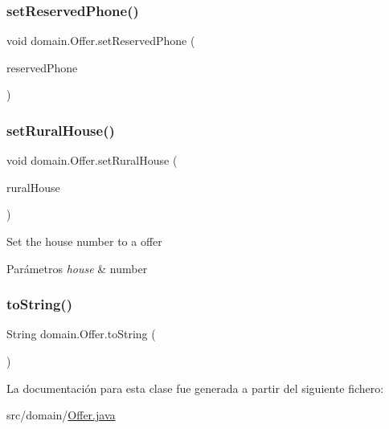 \subsubsection{\texorpdfstring{setReservedPhone()}{setReservedPhone()}}
{\footnotesize\ttfamily void domain.\+Offer.\+set\+Reserved\+Phone (\begin{DoxyParamCaption}\item[{String}]{reserved\+Phone }\end{DoxyParamCaption})}

\mbox{\label{classdomain_1_1_offer_a2050ed4cf76a2a2863d08e89bdf4a7df}} 
\subsubsection{\texorpdfstring{setRuralHouse()}{setRuralHouse()}}
{\footnotesize\ttfamily void domain.\+Offer.\+set\+Rural\+House (\begin{DoxyParamCaption}\item[{\mbox{\hyperlink{classdomain_1_1_rural_house}{Rural\+House}}}]{rural\+House }\end{DoxyParamCaption})}

Set the house number to a offer


\begin{DoxyParams}{Parámetros}
{\em house} & number \\
\hline
\end{DoxyParams}
\mbox{\label{classdomain_1_1_offer_a8838b2d4c6616394f1829d4dc5572952}} 
\subsubsection{\texorpdfstring{toString()}{toString()}}
{\footnotesize\ttfamily String domain.\+Offer.\+to\+String (\begin{DoxyParamCaption}{ }\end{DoxyParamCaption})}



La documentación para esta clase fue generada a partir del siguiente fichero\+:\begin{DoxyCompactItemize}
\item 
src/domain/\mbox{\hyperlink{_offer_8java}{Offer.\+java}}\end{DoxyCompactItemize}
